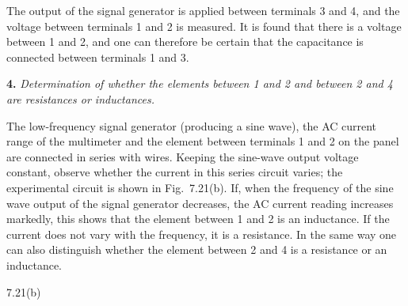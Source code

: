 The output of the signal generator is applied between terminals 3 and 4, and the voltage between terminals 1 and 2 is measured. It is found that there is a voltage between 1 and 2, and one can therefore be certain that the capacitance is connected between terminals 1 and 3.

\textbf{4.} \emph{Determination of whether the elements between 1 and 2 and between 2 and 4 are resistances or inductances.}

The low-frequency signal generator (producing a sine wave), the AC current range of the multimeter and the element between terminals 1 and 2 on the panel are connected in series with wires. Keeping the sine-wave output voltage constant, observe whether the current in this series circuit varies; the experimental circuit is shown in Fig.~7.21(b). If, when the frequency of the sine wave output of the signal generator decreases, the AC current reading increases markedly, this shows that the element between 1 and 2 is an inductance. If the current does not vary with the frequency, it is a resistance. In the same way one can also distinguish whether the element between 2 and 4 is a resistance or an inductance.

\begin{figbox}{7.21(b)}
\end{figbox}

